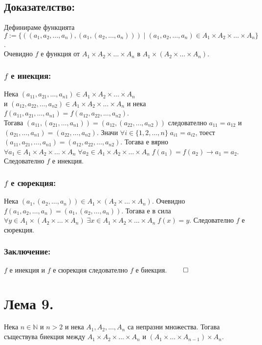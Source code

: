 \documentclass[a4paper, 12pt, oneside]{article}
\newcommand{\N}{\mathbb{N}}
\begin{document}
\subsection*{Доказателство:}
Дефинираме функцията \\
\(f := \{((a_1, a_2, \dots, a_n), (a_1, (a_2, \dots, a_n))) \; | \; (a_1, a_2, \dots, a_n) \in A_1 \times A_2 \times \dots \times A_n\}\). \\
Очевидно \(f\) е функция от \(A_1 \times A_2 \times \dots \times A_n\) в \(A_1 \times (A_2 \times \dots \times A_n)\).
\subsubsection*{\(f\) е инекция:}
Нека \((a_{11}, a_{21}, \dots, a_{n1}) \in A_1 \times A_2 \times \dots \times A_n\) \\
и \((a_{12}, a_{22}, \dots, a_{n2}) \in A_1 \times A_2 \times \dots \times A_n\)
и нека \(f(a_{11}, a_{21}, \dots, a_{n1}) = f(a_{12}, a_{22}, \dots, a_{n2})\). \\
Тогава \((a_{11}, (a_{21}, \dots, a_{n1})) = (a_{12}, (a_{22}, \dots, a_{n2}))\)
следователно \(a_{11} = a_{12}\) и \((a_{21}, \dots, a_{n1}) = (a_{22}, \dots, a_{n2})\).
Значи \(\forall i \in \{1, 2, \dots, n\} \; a_{i1} = a_{i2}\),
тоест \((a_{11}, a_{21}, \dots, a_{n1}) = (a_{12}, a_{22}, \dots, a_{n2})\).
Тогава е вярно \\
\(\forall a_1 \in A_1 \times A_2 \times \dots \times A_n \; \forall a_2 \in A_1 \times A_2 \times \dots \times A_n \; f(a_1) = f(a_2) \longrightarrow a_1 = a_2\).
Следователно \(f\) е инекция.
\subsubsection*{\(f\) е сюрекция:}
Нека \((a_1, (a_2, \dots, a_n)) \in A_1 \times (A_2 \times \dots \times A_n)\).
Очевидно \(f(a_1, a_2, \dots, a_n) = (a_1, (a_2, \dots, a_n))\). Тогава е в сила \\
\(\forall y \in A_1 \times (A_2 \times \dots \times A_n) \; \exists x \in A_1 \times A_2 \times \dots \times A_n \; f(x) = y\).
Следователно \(f\) е сюрекция.
\subsubsection*{Заключение:}
\(f\) е инекция и \(f\) е сюрекция следователно \(f\) е биекция. \(\qed\)
\section*{Лема 9.}
Нека \(n \in \N\) и \(n > 2\) и нека 
\(A_1, A_2, \dots, A_n\) са непразни множества.
Тогава съществува биекция между \(A_1 \times A_2 \times \dots \times A_n\)
и \((A_1 \times \dots \times A_{n - 1}) \times A_n\).
\end{document}
